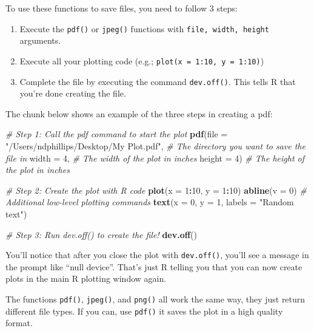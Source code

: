 \documentclass[]{book}
\newenvironment{Shaded}{\begin{snugshade}}{\end{snugshade}}
\newcommand{\KeywordTok}[1]{\textcolor[rgb]{0.13,0.29,0.53}{\textbf{#1}}}
\newcommand{\DataTypeTok}[1]{\textcolor[rgb]{0.13,0.29,0.53}{#1}}
\newcommand{\DecValTok}[1]{\textcolor[rgb]{0.00,0.00,0.81}{#1}}
\newcommand{\StringTok}[1]{\textcolor[rgb]{0.31,0.60,0.02}{#1}}
\newcommand{\CommentTok}[1]{\textcolor[rgb]{0.56,0.35,0.01}{\textit{#1}}}
\newcommand{\OperatorTok}[1]{\textcolor[rgb]{0.81,0.36,0.00}{\textbf{#1}}}
\newcommand{\NormalTok}[1]{#1}
\providecommand{\tightlist}{%
  \setlength{\itemsep}{0pt}\setlength{\parskip}{0pt}}
\theoremstyle{definition}
\theoremstyle{definition}
\theoremstyle{remark}
\begin{document}
To use these functions to save files, you need to follow 3 steps:

\begin{enumerate}
\def\labelenumi{\arabic{enumi}.}
\tightlist
\item
  Execute the \texttt{pdf()} or \texttt{jpeg()} functions with
  \texttt{file,\ width,\ height} arguments.
\item
  Execute all your plotting code (e.g.;
  \texttt{plot(x\ =\ 1:10,\ y\ =\ 1:10)})
\item
  Complete the file by executing the command \texttt{dev.off()}. This
  tells R that you're done creating the file.
\end{enumerate}

The chunk below shows an example of the three steps in creating a pdf:

\begin{Shaded}
\begin{Highlighting}[]
\CommentTok{# Step 1: Call the pdf command to start the plot}
\KeywordTok{pdf}\NormalTok{(}\DataTypeTok{file =} \StringTok{"/Users/ndphillips/Desktop/My Plot.pdf"}\NormalTok{,   }\CommentTok{# The directory you want to save the file in}
    \DataTypeTok{width =} \DecValTok{4}\NormalTok{, }\CommentTok{# The width of the plot in inches}
    \DataTypeTok{height =} \DecValTok{4}\NormalTok{) }\CommentTok{# The height of the plot in inches}

\CommentTok{# Step 2: Create the plot with R code}
\KeywordTok{plot}\NormalTok{(}\DataTypeTok{x =} \DecValTok{1}\OperatorTok{:}\DecValTok{10}\NormalTok{, }
     \DataTypeTok{y =} \DecValTok{1}\OperatorTok{:}\DecValTok{10}\NormalTok{)}
\KeywordTok{abline}\NormalTok{(}\DataTypeTok{v =} \DecValTok{0}\NormalTok{) }\CommentTok{# Additional low-level plotting commands}
\KeywordTok{text}\NormalTok{(}\DataTypeTok{x =} \DecValTok{0}\NormalTok{, }\DataTypeTok{y =} \DecValTok{1}\NormalTok{, }\DataTypeTok{labels =} \StringTok{"Random text"}\NormalTok{)}

\CommentTok{# Step 3: Run dev.off() to create the file!}
\KeywordTok{dev.off}\NormalTok{()}
\end{Highlighting}
\end{Shaded}

You'll notice that after you close the plot with \texttt{dev.off()},
you'll see a message in the prompt like ``null device''. That's just R
telling you that you can now create plots in the main R plotting window
again.

The functions \texttt{pdf()}, \texttt{jpeg()}, and \texttt{png()} all
work the same way, they just return different file types. If you can,
use \texttt{pdf()} it saves the plot in a high quality format.
\end{document}
